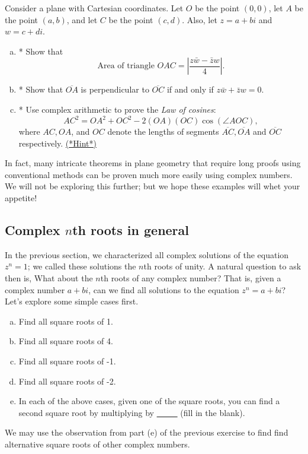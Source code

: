 \begin{exercise}{57}
Consider a plane with Cartesian coordinates. Let $O$ be the point $(0,0)$, let $A$ be the point $(a,b)$, and let $C$ be the point $(c,d)$. Also, let $z = a+bi$ and $w = c+di$.
\begin{enumerate}[(a)]
\item
*  Show that 
\[
\text{Area of triangle }OAC = \left| \frac{z \bar{w} - \bar{z} w}{4} \right|. \]
\item
* Show that $\overline{OA}$ is perpendicular to $\overline{OC}$ if and only if $z \bar{w} + \bar{z} w = 0$.
\item
* Use complex arithmetic to prove the \emph{Law of cosines}:
\[ AC^2 = OA^2 + OC^2 - 2(OA)(OC)\cos(\angle AOC),\]
where $AC,OA$, and $OC$ denote the lengths of segments $\overline{AC}, \overline{OA}$ and $\overline{OC}$ respectively. 
\hyperref[sec:complex:hints]{(*Hint*)}

\end{enumerate}
\end{exercise}

In fact, many intricate theorems in plane geometry that require long proofs using conventional methods can be proven much more easily using complex numbers. We will not be exploring this further; but we hope these examples will whet your appetite!


\subsection{Complex $n$th roots in general 
\quad{}}

In the previous section, we characterized all complex solutions of the equation $z^n = 1$; we called these solutions the $n$th roots of unity. A natural question to ask then is, What about the $n$th roots of any complex number? That is, given a complex number $a + bi$, can we find all solutions to the equation $z^n = a + bi$? Let's explore some simple cases first.

\begin{exercise}{58}
\begin{enumerate}[(a)]
\item
Find all square roots of 1. 
\item
Find all square roots of 4.
\item
Find all square roots of -1.
\item
Find all square roots of -2.
\item
In each of the above cases, given one of the square roots, you can find a second square root by multiplying by \underline{~~~~~} (fill in the blank).
\end{enumerate}
\end{exercise}
We may use the observation from part (e) of the previous exercise to find find alternative square roots of other complex numbers.


